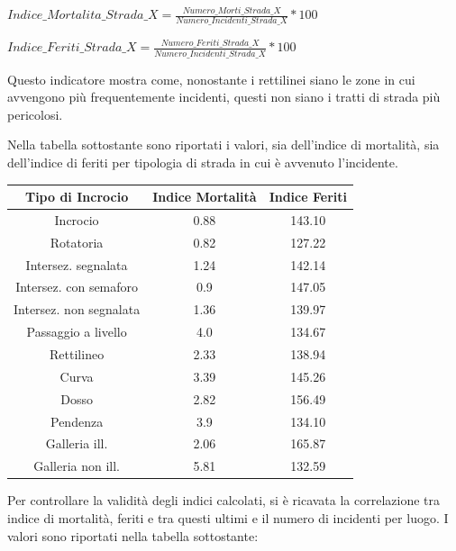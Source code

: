 \documentclass[a4paper,12pt]{report}
\begin{document}
\begin{center}
    $Indice\_Mortalita\_Strada\_X = \displaystyle \frac{Numero\_Morti\_Strada\_X}{Numero\_Incidenti\_Strada\_X} * 100$ 
\end{center}

\begin{center}
    $Indice\_Feriti\_Strada\_X = \displaystyle \frac{Numero\_Feriti\_Strada\_X}{Numero\_Incidenti\_Strada\_X} * 100$ 
\end{center}

Questo indicatore mostra come, nonostante i rettilinei siano le zone in cui 
avvengono più frequentemente incidenti, questi non siano i tratti di 
strada più pericolosi. 

Nella tabella sottostante sono riportati i valori, sia dell'indice di mortalità, 
sia dell'indice di feriti per tipologia di strada in cui è avvenuto l'incidente.

\begin{center}
    \def\arraystretch{1.5}%
    \begin{tabular}{ |c|c|c| } 
    \hline
    Tipo di Incrocio & Indice Mortalità & Indice Feriti \\ 
    \hline
    \rowcolor{TableGray}
    Incrocio                & 0.88 & 143.10 \\
    Rotatoria               & 0.82 & 127.22 \\
    \rowcolor{TableGray}
    Intersez. segnalata     & 1.24 & 142.14 \\
    Intersez. con semaforo  & 0.9 & 147.05 \\
    \rowcolor{TableGray}
    Intersez. non segnalata & 1.36 & 139.97\\
    Passaggio a livello     & 4.0 & 134.67\\
    \rowcolor{TableGray}
    Rettilineo              & 2.33 & 138.94\\
    Curva                   & 3.39 & 145.26\\
    \rowcolor{TableGray}
    Dosso                   & 2.82 & 156.49\\
    Pendenza                & 3.9 & 134.10\\
    \rowcolor{TableGray}
    Galleria ill.           & 2.06 & 165.87\\
    Galleria non ill.       & 5.81 & 132.59\\
    \hline
    \end{tabular}
\end{center}

Per controllare la validità degli indici calcolati, si è ricavata la correlazione 
tra indice di mortalità, feriti e tra questi ultimi e il numero di incidenti per 
luogo.
I valori sono riportati nella tabella sottostante: 
\end{document}

